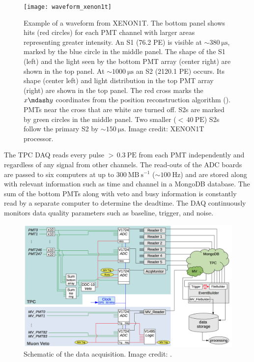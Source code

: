 \begin{figure}
\centering
\texttt{[image: waveform\_xenon1t]}
\caption[Example of a waveform from XENON1T.]{Example of a waveform from XENON1T.  The bottom panel shows hits (red circles) for each PMT
channel with
larger areas representing greater intensity.  An S1 (76.2 PE) is visible at ${\sim}380\ \mathrm{\mu s}$, marked by the blue circle in the
middle panel.  The shape of the S1 (left) and the light seen by the bottom PMT array (center right) are shown in the top panel.  At
${\sim} 1000\ \mathrm{\mu s}$ an S2 (2120.1 PE) occurs.  Its shape (center left) and light distribution in the top PMT array (right) are
shown in the top panel.  The red cross marks the $x \mdash y$ coordinates from the position reconstruction algorithm
().  PMTs near the cross that are white are turned off.  S2s are marked by
green circles in the middle panel.  Two smaller (${<}\, 40\ \mathrm{PE}$) S2s follow the primary S2 by ${\sim}150\ \mathrm{\mu s}$.  Image
credit: XENON1T processor.}
\label{fig:xenon1t_waveform}
\end{figure}

The TPC DAQ reads every pulse ${>}\, 0.3\ \mathrm{PE}$ from each PMT independently and regardless of any signal from other
channels.  The read-outs of the ADC boards are passed to six computers at up to $300\ \mathrm{MB\ s^{-1}}$ (${\sim}100\ \mathrm{Hz}$) and
are stored along with relevant information such as time and channel in a MongoDB database.  The sum of the bottom PMTs along with veto
and busy information is constantly read by a separate computer to determine the deadtime.  The DAQ continuously monitors data quality
parameters such as baseline, trigger, and noise.

\begin{figure}
\centering
\includegraphics[width=\textwidth]{DAQ}
\caption{Schematic of the data acquisition.  Image credit: .}
\label{fig:xenon1t_daq_schematic}
\end{figure}

